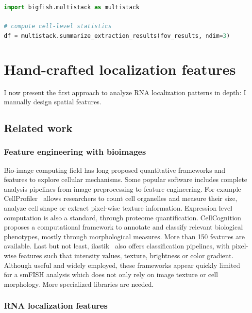 \begin{minipage}{0.9\textwidth}
\begin{lstlisting}[language=Python]
import bigfish.multistack as multistack

# compute cell-level statistics
df = multistack.summarize_extraction_results(fov_results, ndim=3)
\end{lstlisting}
\end{minipage}

\section{Hand-crafted localization features}
\label{sec:hand_features}

I now present the first approach to analyze \ac{RNA} localization patterns in depth: I manually design spatial features.

\subsection{Related work}
\label{subsec:related_work_hand_features}

\subsubsection{Feature engineering with bioimages}

Bio-image computing field has long proposed quantitative frameworks and features to explore cellular mechanisms.
Some popular software includes complete analysis pipelines from image preprocessing to feature engineering.
For example CellProfiler~\cite{mcquin_cellprofiler_2018} allows researchers to count cell organelles and measure their size, analyze cell shape or extract pixel-wise texture information.
Expression level computation is also a standard, through proteome quantification.
CellCognition~\cite{held_cellcognition_2010} proposes a computational framework to annotate and classify relevant biological phenotypes, mostly through morphological measures.
More than 150 features are available.
Last but not least, ilastik~\cite{berg_ilastik_2019} also offers classification pipelines, with pixel-wise features such that intensity values, texture, brightness or color gradient.
Although useful and widely employed, these frameworks appear quickly limited for a \ac{smFISH} analysis which does not only rely on image texture or cell morphology.
More specialized libraries are needed.

\subsubsection{\ac{RNA} localization features}

